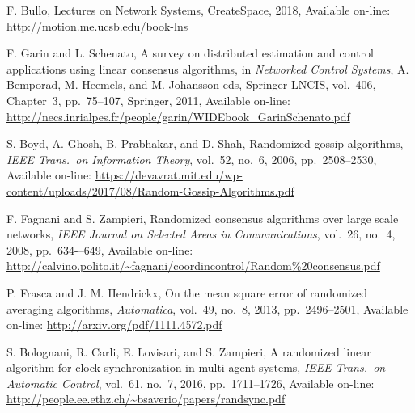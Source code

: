 \documentclass[oneside]{article}
\begin{document}
\begin{thebibliography}{99}

F. Bullo, Lectures on Network Systems, CreateSpace, 2018, Available on-line: \url{http://motion.me.ucsb.edu/book-lns}

F. Garin and L. Schenato, A survey on distributed estimation and control applications using linear consensus algorithms, in {\it Networked Control Systems}, A. Bemporad, M. Heemels, and M. Johansson eds, Springer LNCIS, vol.~406, Chapter~3, pp.~75--107, Springer, 2011, Available on-line: \url{http://necs.inrialpes.fr/people/garin/WIDEbook_GarinSchenato.pdf}


S. Boyd, A. Ghosh, B. Prabhakar, and D. Shah, Randomized gossip algorithms, {\it IEEE Trans.\ on Information Theory}, vol.~52, no.~6, 2006, pp.~2508--2530, Available on-line: \url{https://devavrat.mit.edu/wp-content/uploads/2017/08/Random-Gossip-Algorithms.pdf}


F. Fagnani and S. Zampieri, Randomized consensus algorithms over large scale networks,
{\it IEEE Journal on Selected Areas in Communications}, vol.~26, no.~4, 2008, pp.~634-–649, Available on-line:
\url{http://calvino.polito.it/~fagnani/coordincontrol/Random%20consensus.pdf}

P. Frasca and J. M. Hendrickx, On the mean square error of randomized averaging algorithms, {\it Automatica}, vol.~49, no.~8, 2013, pp.~2496--2501, Available on-line: \url{http://arxiv.org/pdf/1111.4572.pdf}

S. Bolognani, R. Carli, E. Lovisari, and S. Zampieri,
A randomized linear algorithm for clock synchronization in multi-agent systems,
{\it IEEE Trans.\ on Automatic Control}, vol.~61, no.~7, 2016, pp.~1711--1726, Available on-line:
\url{http://people.ee.ethz.ch/~bsaverio/papers/randsync.pdf}


\end{thebibliography}
\end{document}
